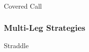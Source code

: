 \documentclass[10pt]{article}
\begin{document}
      \begin{core}{Covered Call}


      \end{core}

    \subsubsection{Multi-Leg Strategies}



      \begin{core}{Straddle}


      \end{core}
\end{document}
